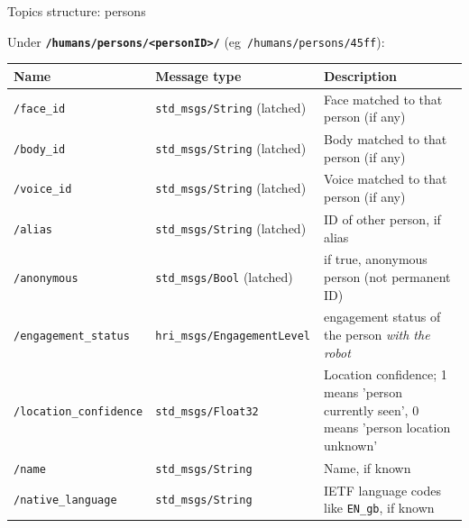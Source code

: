 \documentclass[xcolor=table]{beamer}
\begin{document}
\begin{frame}{Topics structure: persons}

    Under \textbf{\texttt{/humans/persons/<personID>/}} (eg~\texttt{/humans/persons/45ff}):

    \scriptsize
    \begin{tabular}{@{}llp{4cm}@{}}
        \toprule
        \textbf{Name} & \textbf{Message type}         & \textbf{Description}                                                \\ \midrule
        \texttt{/face\_id            } & \texttt{std\_msgs/String} (latched) & Face matched to that person (if any)                                                    \\
        \texttt{/body\_id            } & \texttt{std\_msgs/String} (latched) & Body matched to that person (if any)                                                    \\
        \texttt{/voice\_id           } & \texttt{std\_msgs/String} (latched) & Voice matched to that person (if any)                                                   \\
        \texttt{/alias           } & \texttt{std\_msgs/String} (latched) & ID of other person, if alias                                                    \\
        \texttt{/anonymous           } & \texttt{std\_msgs/Bool} (latched) & if true, anonymous person (not permanent ID)   \\
        \texttt{/engagement\_status} & \texttt{hri\_msgs/EngagementLevel        }  & engagement status of the person \emph{with the robot} \\
        \texttt{/location\_confidence} & \texttt{std\_msgs/Float32        }  & Location confidence; 1 means 'person currently seen', 0 means 'person location unknown' \\
        \texttt{/name                } & \texttt{std\_msgs/String         }  & Name, if known                                                                          \\
        \texttt{/native\_language    } & \texttt{std\_msgs/String         }  & IETF language codes like \texttt{EN\_gb}, if known    \\
\bottomrule
\end{tabular}
    
\end{frame}
\end{document}
